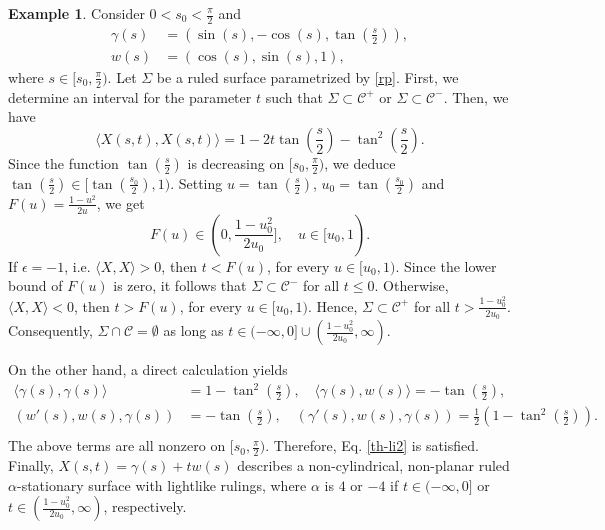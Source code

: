 \documentclass[a4paper,12pt]{amsart}
\theoremstyle{definition}
\newtheorem{example}[theorem]{Example}
\begin{document}
 \begin{example}
Consider $0<s_0<\frac{\pi}{2}$ and
\begin{equation*}
\begin{split}
\gamma(s)&=( \sin (s), -\cos (s), \tan(\frac{s}{2})),\\
w(s)&= (\cos (s), \sin (s),1),
\end{split}
\end{equation*}
where $s\in [s_0,\frac{\pi}{2})$. Let $\Sigma$ be a ruled surface parametrized by \eqref{rp}. First, we determine an interval for the parameter $t$ such that $\Sigma \subset \mathcal{C}^+$ or $\Sigma \subset \mathcal{C}^-$. Then, we have
$$
\langle X(s,t),X(s,t)\rangle=1-2t\tan(\frac{s}{2})-\tan^2(\frac{s}{2}).
$$
Since the function $\tan (\frac{s}{2})$ is decreasing on $[s_0,\frac{\pi}{2})$, we deduce $\tan(\frac{s}{2}) \in [\tan(\frac{s_0}{2}), 1)$. Setting $u=\tan(\frac{s}{2})$, $u_0=\tan(\frac{s_0}{2})$ and $F(u)=\frac{1-u^2}{2u}$, we get
$$
F(u)\in (0,\frac{1-u_0^2}{2u_0}], \quad u\in [u_0,1).
$$
If $\epsilon=-1$, i.e. $\langle X,X\rangle >0$, then $t< F(u) $, for every $u\in [u_0,1)$. Since the lower bound of $F(u)$ is zero, it follows that $\Sigma \subset \mathcal{C}^-$ for all $t \leq 0$. Otherwise, $\langle X,X\rangle <0$, then $t>F(u) $, for every $u\in [u_0,1)$. Hence, $\Sigma \subset \mathcal{C}^+$ for all $t>\frac{1-u_0^2}{2u_0}$. Consequently, $\Sigma \cap \mathcal{C}=\emptyset$ as long as $t\in (-\infty,0]\cup (\frac{1-u_0^2}{2u_0},\infty)$.

On the other hand, a direct calculation yields
\begin{equation*}
\begin{split}
\langle \gamma(s),\gamma(s)\rangle &= 1-\tan^2(\frac{s}{2}), \quad \langle \gamma(s),w(s)\rangle =-\tan(\frac{s}{2}),\\ 
(w'(s),w(s),\gamma(s))&= -\tan(\frac{s}{2}), \quad (\gamma'(s),w(s),\gamma(s))= \frac12 (1-\tan^2(\frac{s}{2})). \\
\end{split}
\end{equation*}
The above terms are all nonzero on $ [s_0,\frac{\pi}{2})$. Therefore, Eq. \ref{th-li2} is satisfied. Finally, $X(s,t)=\gamma(s)+tw(s)$ describes a non-cylindrical, non-planar ruled $\alpha$-stationary surface with lightlike rulings, where $\alpha$ is $4$ or $-4$ if $t\in (-\infty,0]$ or $t\in(\frac{1-u_0^2}{2u_0},\infty)$, respectively.




\end{example}
\end{document}
